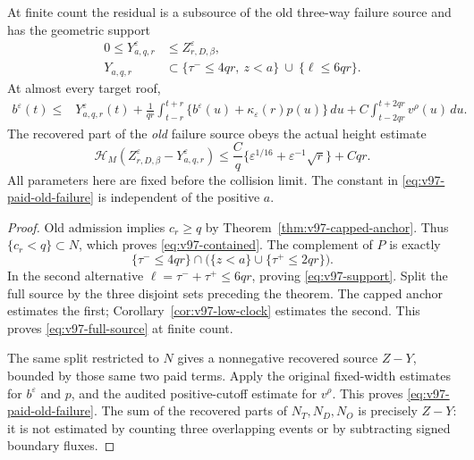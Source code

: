 \begin{theorem}
\label{thm:v97-reduction}
At finite count the residual is a subsource of the old three-way
failure source and has the geometric support
\begin{align}
 0\le Y_{a,q,r}^\varepsilon&\le Z_{r,D,\beta}^\varepsilon,
                                      \label{eq:v97-contained}\\
 Y_{a,q,r}&\subset
 \{\tau^-\le4qr,\ z<a\}\ \cup\ \{\ell\le6qr\}.
                                      \label{eq:v97-support}
\end{align}
At almost every target roof,
\begin{align}
 b^\varepsilon(t)\le{}&Y_{a,q,r}^\varepsilon(t)
 +\frac1{qr}\int_{t-r}^{t+r}
               \{b^\varepsilon(u)+\kappa_\varepsilon(r)p(u)\}\,du
 +C\int_{t-2qr}^{t+2qr}v^\rho(u)\,du.
                                      \label{eq:v97-full-source}
\end{align}
The recovered part of the \emph{old} failure source obeys the actual
height estimate
\begin{equation}\label{eq:v97-paid-old-failure}
 \mathcal H_M(Z_{r,D,\beta}^\varepsilon-Y_{a,q,r}^\varepsilon)
 \le\frac Cq\{\varepsilon^{1/16}+\varepsilon^{-1}\sqrt r\}+Cqr.
\end{equation}
All parameters here are fixed before the collision limit. The constant
in \eqref{eq:v97-paid-old-failure} is independent of the positive $a$.
\end{theorem}
\begin{proof}
Old admission implies $c_r\ge q$ by
Theorem~\ref{thm:v97-capped-anchor}. Thus $\{c_r<q\}\subset N$,
which proves \eqref{eq:v97-contained}. The complement of $P$ is
exactly
\[
 \{\tau^-\le4qr\}\cap\bigl(\{z<a\}\cup\{\tau^+\le2qr\}\bigr).
\]
In the second alternative $\ell=\tau^-+\tau^+\le6qr$, proving
\eqref{eq:v97-support}. Split the full source by the three disjoint
sets preceding the theorem. The capped anchor estimates the first;
Corollary~\ref{cor:v97-low-clock} estimates the second. This proves
\eqref{eq:v97-full-source} at finite count.

The same split restricted to $N$ gives a nonnegative recovered source
$Z-Y$, bounded by those same two paid terms. Apply the original
fixed-width estimates for $b^\varepsilon$ and $p$, and the audited
positive-cutoff estimate for $v^\rho$. This proves
\eqref{eq:v97-paid-old-failure}. The sum of the recovered parts of
$N_T,N_D,N_O$ is precisely $Z-Y$: it is not estimated by counting
three overlapping events or by subtracting signed boundary fluxes.
\end{proof}

